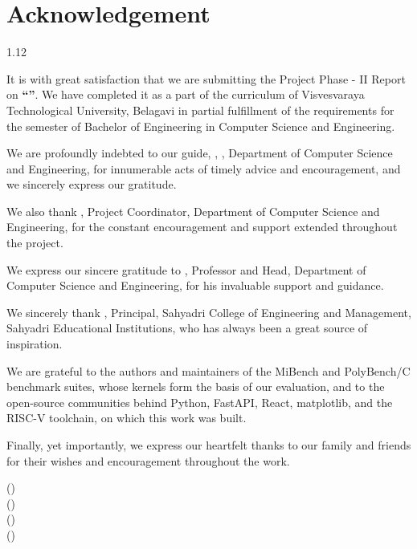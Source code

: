 \chapter*{Acknowledgement}
\begin{spacing}{1.12}

It is with great satisfaction that we are submitting the Project Phase - II Report on \textbf{``\ProjectTitle''}. We have completed it as a part of the curriculum of Visvesvaraya Technological University, Belagavi in partial fulfillment of the requirements for the \Semester{} semester of Bachelor of Engineering in Computer Science and Engineering.

We are profoundly indebted to our guide, \textbf{\GuideName}, \GuideDesignation, Department of Computer Science and Engineering, for innumerable acts of timely advice and encouragement, and we sincerely express our gratitude.

We also thank \textbf{\CoordinatorName}, Project Coordinator, Department of Computer Science and Engineering, for the constant encouragement and support extended throughout the project.

We express our sincere gratitude to \textbf{\HodName}, Professor and Head, Department of Computer Science and Engineering, for his invaluable support and guidance.

We sincerely thank \textbf{\PrincipalName}, Principal, Sahyadri College of Engineering and Management, Sahyadri Educational Institutions, who has always been a great source of inspiration.

We are grateful to the authors and maintainers of the MiBench and PolyBench/C benchmark suites, whose kernels form the basis of our evaluation, and to the open-source communities behind Python, FastAPI, React, matplotlib, and the RISC-V toolchain, on which this work was built.

Finally, yet importantly, we express our heartfelt thanks to our family and friends for their wishes and encouragement throughout the work.

\vspace{0.3em}
\begin{flushright}
\StudentA{} (\UsnA)\\
\StudentB{} (\UsnB)\\
\StudentC{} (\UsnC)\\
\StudentD{} (\UsnD)
\end{flushright}
\end{spacing}
